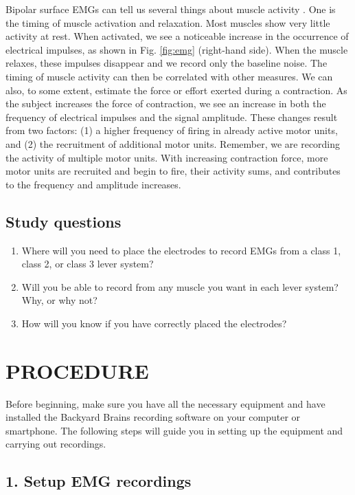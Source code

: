 \documentclass[12pt]{article}
\begin{document}
Bipolar surface EMGs can tell us several things about muscle activity \cite{garcia2011surface}. One is the timing of muscle activation and relaxation. Most muscles show very little activity at rest. When activated, we see a noticeable increase in the occurrence of electrical impulses, as shown in Fig. \ref{fig:emg} (right-hand side). When the muscle relaxes, these impulses disappear and we record only the baseline noise. The timing of muscle activity can then be correlated with other measures. We can also, to some extent, estimate the force or effort exerted during a contraction. As the subject increases the force of contraction, we see an increase in both the frequency of electrical impulses and the signal amplitude. These changes result from two factors: (1) a higher frequency of firing in already active motor units, and (2) the recruitment of additional motor units. Remember, we are recording the activity of multiple motor units. With increasing contraction force, more motor units are recruited and begin to fire, their activity sums, and contributes to the frequency and amplitude increases.

\subsection*{Study questions} 
\begin{enumerate}
\item Where will you need to place the electrodes to record EMGs from a class 1, class 2, or class 3 lever system?
\item Will you be able to record from any muscle you want in each lever system? Why, or why not? 
\item How will you know if you have correctly placed the electrodes?
\end{enumerate}

\section*{PROCEDURE}

Before beginning, make sure you have all the necessary equipment and have installed the Backyard Brains recording software on your computer or smartphone. The following steps will guide you in setting up the equipment and carrying out recordings.

\subsection*{1. Setup EMG recordings}
\end{document}
